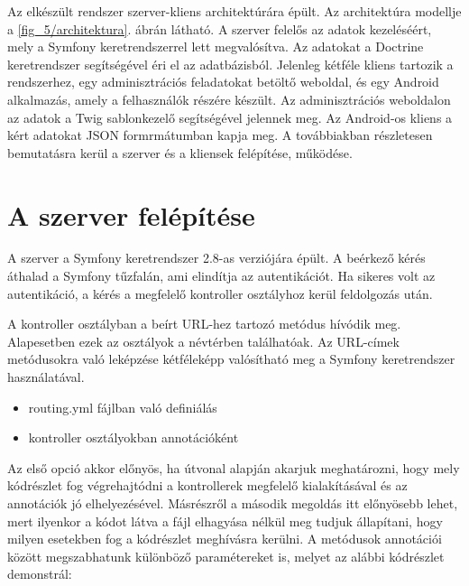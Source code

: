 ﻿Az elkészült rendszer szerver-kliens architektúrára épült. 
Az architektúra modellje a \ref{fig_5/architektura}. ábrán látható. 
A szerver felelős az adatok kezeléséért, mely a Symfony keretrendszerrel lett megvalósítva. 
Az adatokat a Doctrine keretrendszer segítségével éri el az adatbázisból. 
Jelenleg kétféle kliens tartozik a rendszerhez, egy adminisztrációs feladatokat betöltő weboldal, és egy Android alkalmazás, amely a felhasználók részére készült. 
Az adminisztrációs weboldalon az adatok a Twig sablonkezelő segítségével jelennek meg. 
Az Android-os kliens a kért adatokat JSON formrmátumban kapja meg. 
A továbbiakban részletesen bemutatásra kerül a szerver és a kliensek felépítése, működése. 

\section{A szerver felépítése}
\label{szerverfelepites}

A szerver a Symfony keretrendszer 2.8-as verziójára épült. 
A beérkező kérés áthalad a Symfony tűzfalán, ami elindítja az autentikációt. 
Ha sikeres volt az autentikáció, a kérés a megfelelő kontroller osztályhoz kerül feldolgozás után. 


A kontroller osztályban a beírt URL-hez tartozó metódus hívódik meg. 
Alapesetben ezek az osztályok a  névtérben találhatóak. 
Az URL-címek metódusokra való leképzése kétféleképp valósítható meg a Symfony keretrendszer használatával. 

\begin{itemize}
	\item routing.yml fájlban való definiálás
	\item kontroller osztályokban annotációként
\end{itemize}

Az első opció akkor előnyös, ha útvonal alapján akarjuk meghatározni, hogy mely kódrészlet fog végrehajtódni a kontrollerek megfelelő kialakításával és az annotációk jó elhelyezésével. 
Másrészről a második megoldás itt előnyösebb lehet, mert ilyenkor a kódot látva a fájl elhagyása nélkül meg tudjuk állapítani, hogy milyen esetekben fog a kódrészlet meghívásra kerülni. 
A metódusok annotációi között megszabhatunk különböző paramétereket is, melyet az alábbi kódrészlet demonstrál:

